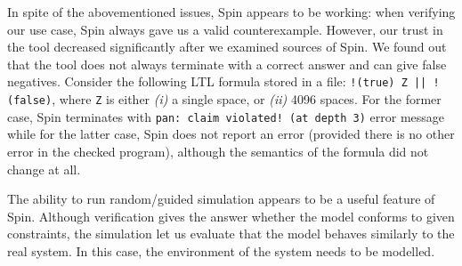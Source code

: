 In spite of the abovementioned issues, Spin appears to be working: when verifying our use case, Spin always gave us a valid counterexample. However, our trust in the tool decreased significantly after we examined sources of Spin. We found out that the tool does not always terminate with a correct answer and can give false negatives. Consider the following LTL formula stored in a file: \texttt{!(true) Z || !(false)}, where \texttt{Z} is either \textit{(i)} a single space, or \textit{(ii)} 4096 spaces. For the former case, Spin terminates with \texttt{pan: claim violated! (at depth 3)} error message while for the latter case, Spin does not report an error (provided there is no other error in the checked program), although the semantics of the formula did not change at all.

The ability to run random/guided simulation appears to be a useful feature of Spin. Although verification gives the answer whether the model conforms to given constraints, the simulation let us evaluate that the model behaves similarly to the real system. In this case, the environment of the system needs to be modelled.


